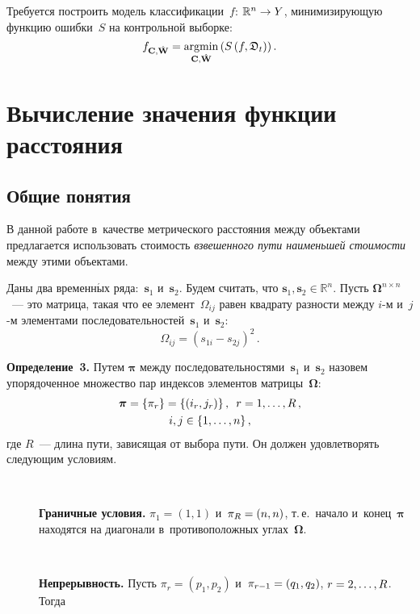 \begin{multicols}{2}
Требуется построить модель 
классификации~$f$: $\mathbb{R}^n \hm\rightarrow Y$, минимизирующую функцию ошибки~$S$ 
на контрольной выборке:
\begin{equation*}
f_{\mathbf{C},\hat{\mathbf{W}}} =  \mathop{\mathrm{argmin}}
\limits_{{\mathbf{C},\hat{\mathbf{W}}}}\left(S\left(f,\mathfrak{D}_t\right)\right).
\end{equation*}

\section{Вычисление значения функции расстояния}

\subsection{Общие понятия}

В данной работе в~качестве метрического расстояния между объектами предлагается 
использовать стоимость \textit{взвешенного пути наименьшей стоимости} 
между этими объектами.

 Даны два временн$\acute{\mbox{ы}}$х ряда:~$\mathbf{s}_1$ и~$\mathbf{s}_2$. Будем считать, 
 что $\mathbf{s}_1,\mathbf{s}_2 \in \mathbb{R}^{n}$. Пусть 
 $\boldsymbol{\Omega}^{n \times n}$~--- это матрица, такая что ее 
 элемент~$\Omega_{ij}$ равен квадрату разности между $i$-м и~$j$-м элементами 
 последовательностей~$\mathbf{s}_1$ и~$\mathbf{s}_2$:
\begin{equation*}
{\Omega}_{ij}=\left({s}_{1i} - {s}_{2j}\right)^2\,.
\end{equation*}

\noindent
\textbf{Определение~3.} 
Путем $\boldsymbol{\pi}$ между последовательностями~$\mathbf{s}_1$ и~$\mathbf{s}_2$ 
назовем упорядоченное множество пар индексов элементов матрицы~$\boldsymbol{\Omega}$: 
\begin{multline*}
\boldsymbol{\pi} = \{\pi_r\} = \{(i_r,j_r)\}\,,\enskip 
r = 1, \dots, R\,,\\ i,j \in \{1,\ldots,n\} \,,
\end{multline*}
где $R$~--- длина пути, 
зависящая от выбора пути. Он должен удовлетворять следующим условиям.
\begin{description}
\item[\,]
\textbf{Граничные условия.}
  ${\pi}_1 = (1,1)$ и~${\pi}_R \hm= (n,n)$, т.\,е.\
   начало и~конец~$\boldsymbol{\pi}$ находятся на диагонали в~противоположных 
   углах~$\boldsymbol{\Omega}.$

\item[\,] \textbf{Непрерывность.}
 Пусть ${\pi}_r = (p_1,p_2)$ и~${\pi}_{r-1} \hm= (q_1,q_2)$, $r \hm= 2,\ldots,R$. 
 Тогда 
 

\end{description}
\end{multicols}
